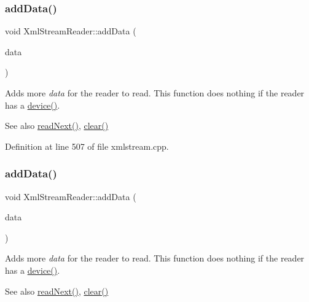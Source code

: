 \subsubsection{\texorpdfstring{add\+Data()}{addData()}\hspace{0.1cm}{\footnotesize\ttfamily [2/3]}}
{\footnotesize\ttfamily void Xml\+Stream\+Reader\+::add\+Data (\begin{DoxyParamCaption}\item[{const Q\+String \&}]{data }\end{DoxyParamCaption})}

Adds more {\itshape data} for the reader to read. This function does nothing if the reader has a \hyperlink{class_xml_stream_reader_aa2a751d1b36fac13138b2f370683dfe7}{device()}.

\begin{DoxySeeAlso}{See also}
\hyperlink{class_xml_stream_reader_adb18e6f9842e9b470cde16385732ad84}{read\+Next()}, \hyperlink{class_xml_stream_reader_a2a67f5a1fff83d33214ccc9ec9494ca0}{clear()} 
\end{DoxySeeAlso}


Definition at line 507 of file xmlstream.\+cpp.

\mbox{\label{class_xml_stream_reader_a4dc8d02a038a0b16e6a47f5d2a36d8a3}} 
\subsubsection{\texorpdfstring{add\+Data()}{addData()}\hspace{0.1cm}{\footnotesize\ttfamily [3/3]}}
{\footnotesize\ttfamily void Xml\+Stream\+Reader\+::add\+Data (\begin{DoxyParamCaption}\item[{const char $\ast$}]{data }\end{DoxyParamCaption})}

Adds more {\itshape data} for the reader to read. This function does nothing if the reader has a \hyperlink{class_xml_stream_reader_aa2a751d1b36fac13138b2f370683dfe7}{device()}.

\begin{DoxySeeAlso}{See also}
\hyperlink{class_xml_stream_reader_adb18e6f9842e9b470cde16385732ad84}{read\+Next()}, \hyperlink{class_xml_stream_reader_a2a67f5a1fff83d33214ccc9ec9494ca0}{clear()} 
\end{DoxySeeAlso}


